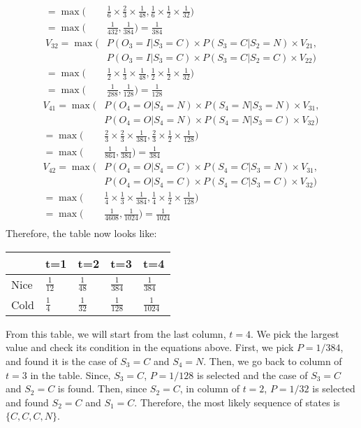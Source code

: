 \documentclass[11pt]{article}
\begin{document}
\begin{itemize}
\begin{align*}
= \max ( & \frac{1}{6} \times \frac{2}{3} \times \frac{1}{48}, \frac{1}{6} \times \frac{1}{2} \times \frac{1}{32}) \\
=\max ( & \frac{1}{432},\frac{1}{384})=\frac{1}{384} \\
V_{32} = \max (&P(O_3=I|S_3=C) \times P(S_3=C|S_2=N) \times V_{21}, \\
&P(O_3=I|S_3=C) \times P(S_3=C|S_2=C) \times V_{22} ) \\
= \max ( & \frac{1}{2} \times \frac{1}{3} \times \frac{1}{48}, \frac{1}{2} \times \frac{1}{2} \times \frac{1}{32}) \\
=\max ( & \frac{1}{288},\frac{1}{128})=\frac{1}{128} 
\end{align*}
\begin{align*}
V_{41} = \max (&P(O_4=O|S_4=N) \times P(S_4=N|S_3=N) \times V_{31}, \\
&P(O_4=O|S_4=N) \times P(S_4=N|S_3=C) \times V_{32} ) \\
= \max ( & \frac{2}{3} \times \frac{2}{3} \times \frac{1}{384}, \frac{2}{3} \times \frac{1}{2} \times \frac{1}{128}) \\
=\max ( & \frac{1}{864},\frac{1}{384})=\frac{1}{384} \\
V_{42} = \max (&P(O_4=O|S_4=C) \times P(S_4=C|S_3=N) \times V_{31}, \\
&P(O_4=O|S_4=C) \times P(S_4=C|S_3=C) \times V_{32} ) \\
= \max ( & \frac{1}{4} \times \frac{1}{3} \times \frac{1}{384}, \frac{1}{4} \times \frac{1}{2} \times \frac{1}{128}) \\
=\max ( & \frac{1}{4608},\frac{1}{1024})=\frac{1}{1024} \\
\end{align*}
Therefore, the table now looks like:
\begin{table}[h]
\centering
\label{my-label}
\begin{tabular}{lllll}
\hline
\textbf{} & \textbf{t=1} & \textbf{t=2} & \textbf{t=3} & \textbf{t=4} \\ \hline
Nice      & $\frac{1}{12}$         &     $\frac{1}{48}$         &     $\frac{1}{384}$         &      $\frac{1}{384}$        \\ \hline
Cold      &       $\frac{1}{4}$       &     $\frac{1}{32}$         &     $\frac{1}{128}$         &     $\frac{1}{1024}$         \\ \hline
\end{tabular}
\end{table}

From this table, we will start from the last column, $t=4$. We pick the largest value and check its condition in the equations above. First, we pick $P=1/384$, and found it is the case of $S_3=C$ and $S_4=N$. Then, we go back to column of $t=3$ in the table. Since, $S_3=C$, $P=1/128$ is selected and the case of $S_3=C$ and $S_2=C$ is found. Then, since $S_2=C$, in column of $t=2$, $P=1/32$ is selected and found $S_2=C$ and $S_1=C$. Therefore, the most likely sequence of states is $\{C,C,C,N\}$.
\end{itemize}
\end{document}
